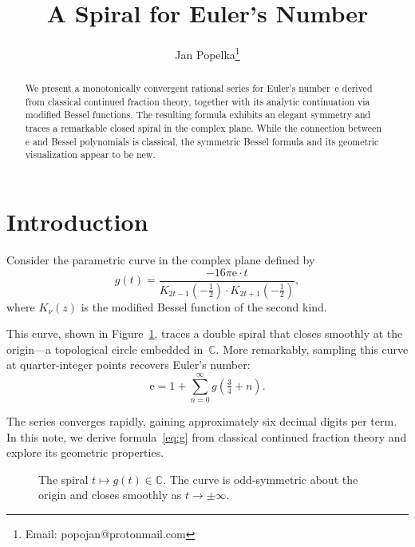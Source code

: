 \documentclass[11pt]{article}
\title{A Spiral for Euler's Number}
\author{Jan Popelka\thanks{Email: popojan@protonmail.com}}
\date{}
\theoremstyle{definition}
\theoremstyle{remark}
\newcommand{\ee}{\mathrm{e}}
\newcommand{\C}{\mathbb{C}}
\begin{document}
\maketitle

\begin{abstract}
We present a monotonically convergent rational series for Euler's number~$\ee$
derived from classical continued fraction theory, together with its analytic
continuation via modified Bessel functions. The resulting formula exhibits an
elegant symmetry and traces a remarkable closed spiral in the complex plane.
While the connection between~$\ee$ and Bessel polynomials is classical, the
symmetric Bessel formula and its geometric visualization appear to be new.
\end{abstract}

\section{Introduction}

Consider the parametric curve in the complex plane defined by
\begin{equation}\label{eq:g}
g(t) = \frac{-16\pi\ee \cdot t}
       {K_{2t-1}\!\left(-\tfrac{1}{2}\right) \cdot K_{2t+1}\!\left(-\tfrac{1}{2}\right)},
\end{equation}
where $K_\nu(z)$ is the modified Bessel function of the second kind.

This curve, shown in Figure~\ref{fig:spiral}, traces a double spiral that closes
smoothly at the origin---a topological circle embedded in~$\C$. More remarkably,
sampling this curve at quarter-integer points recovers Euler's number:
\begin{equation}\label{eq:e-series}
\ee = 1 + \sum_{n=0}^{\infty} g\!\left(\tfrac{3}{4} + n\right).
\end{equation}

The series converges rapidly, gaining approximately six decimal digits per term.
In this note, we derive formula~\eqref{eq:g} from classical continued fraction
theory and explore its geometric properties.

\begin{figure}[ht]
\centering
\caption{The spiral $t \mapsto g(t) \in \C$. The curve is odd-symmetric about
the origin and closes smoothly as $t \to \pm\infty$.}
\label{fig:spiral}
\end{figure}
\end{document}
